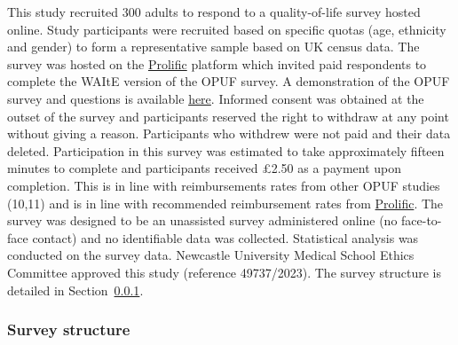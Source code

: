 \documentclass[
  letterpaper,
  DIV=11,
  numbers=noendperiod]{scrartcl}
\begin{document}
This study recruited 300 adults to respond to a quality-of-life survey
hosted online. Study participants were recruited based on specific
quotas (age, ethnicity and gender) to form a representative sample based
on UK census data. The survey was hosted on the
\href{https://www.prolific.com}{Prolific} platform which invited paid
respondents to complete the WAItE version of the OPUF survey. A
demonstration of the OPUF survey and questions is available
\href{https://survey.valorem.health/waite_opuf_adult2}{here}. Informed
consent was obtained at the outset of the survey and participants
reserved the right to withdraw at any point without giving a reason.
Participants who withdrew were not paid and their data deleted.
Participation in this survey was estimated to take approximately fifteen
minutes to complete and participants received £2.50 as a payment upon
completion. This is in line with reimbursements rates from other OPUF
studies (10,11) and is in line with recommended reimbursement rates from
\href{https://www.prolific.com}{Prolific}. The survey was designed to be
an unassisted survey administered online (no face-to-face contact) and
no identifiable data was collected. Statistical analysis was conducted
on the survey data. Newcastle University Medical School Ethics Committee
approved this study (reference 49737/2023). The survey structure is
detailed in Section~\ref{sec-surveystructure}.

\subsubsection{Survey structure}\label{sec-surveystructure}
\end{document}
